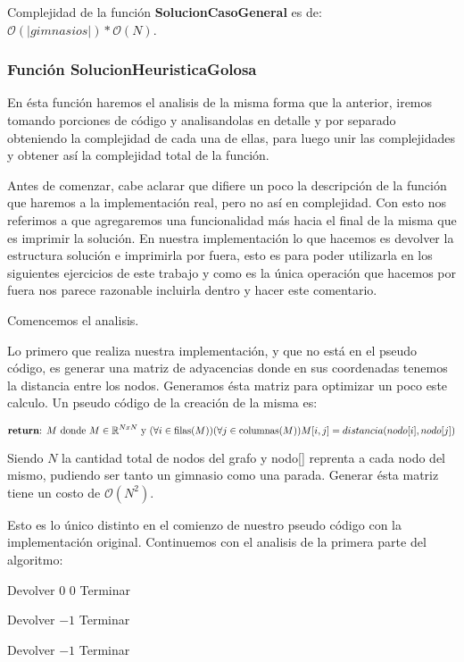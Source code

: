 Complejidad de la función \textbf{SolucionCasoGeneral} es de: $\mathcal{O}(|gimnasios|) * \mathcal{O}(N)$.


\subsubsection{Función SolucionHeuristicaGolosa}


En ésta función haremos el analisis de la misma forma que la anterior, iremos tomando porciones de código y analisandolas en detalle y por separado obteniendo la complejidad de cada una de ellas, para luego unir las complejidades y obtener así la complejidad total de la función.

Antes de comenzar, cabe aclarar que difiere un poco la descripción de la función que haremos a la implementación real, pero no así en complejidad. Con esto nos referimos a que agregaremos una funcionalidad más hacia el final de la misma que es imprimir la solución. En nuestra implementación lo que hacemos es devolver la estructura solución e imprimirla por fuera, esto es para poder utilizarla en los siguientes ejercicios de este trabajo y como es la única operación que hacemos por fuera nos parece razonable incluirla dentro y hacer este comentario.

Comencemos el analisis.

Lo primero que realiza nuestra implementación, y que no está en el pseudo código, es generar una matriz de adyacencias donde en sus coordenadas tenemos la distancia entre los nodos. Generamos ésta matriz para optimizar un poco este calculo. Un pseudo código de la creación de la misma es:

\[
	\text{\textbf{return}:  } M \text{ donde } M \in \mathbb{R}^{NxN} \text{ y } (\forall i \in \text{filas($M$)})(\forall j \in \text{columnas($M$)}) M[i,j] = distancia(nodo[i], nodo[j])
\]

Siendo $N$ la cantidad total de nodos del grafo y nodo[] reprenta a cada nodo del mismo, pudiendo ser tanto un gimnasio como una parada. Generar ésta matriz tiene un costo de $\mathcal{O}(N^2)$.

Esto es lo único distinto en el comienzo de nuestro pseudo código con la implementación original. Continuemos con el analisis de la primera parte del algoritmo:

\begin{algorithm}[H]
\label{}
\begin{algorithmic}[]

	\State Devolver $0$ $0$
	\State Terminar
\EndIf

	\State Devolver $-1$
	\State Terminar
\EndIf

	\State Devolver $-1$
	\State Terminar
\EndIf

\medskip
\Statex \underline{}
\end{algorithmic}
\end{algorithm}

